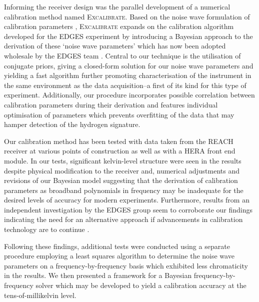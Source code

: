 Informing the receiver design was the parallel development of a numerical calibration method named \textsc{Excalibrate}. Based on the noise wave formulation of calibration parameters \citep{meys}, \textsc{Excalibrate} expands on the calibration algorithm developed for the EDGES experiment \citep{edgesCal} by introducing a Bayesian approach to the derivation of these ‘noise wave parameters’ which has now been adopted wholesale by the EDGES team \citep{murray_calpap}. Central to our technique is the utilisation of conjugate priors, giving a closed-form solution for our noise wave parameters and yielding a fast algorithm further promoting characterisation of the instrument in the same environment as the data acquisition--a first of its kind for this type of experiment. Additionally, our procedure incorporates possible correlation between calibration parameters during their derivation and features individual optimisation of parameters which prevents overfitting of the data that may hamper detection of the hydrogen signature.

Our calibration method has been tested with data taken from the REACH receiver at various points of construction as well as with a HERA front end module. In our tests, significant kelvin-level structure were seen in the results despite physical modification to the receiver and, numerical adjustments and revisions of our Bayesian model suggesting that the derivation of calibration parameters as broadband polynomials in frequency may be inadequate for the desired levels of accuracy for modern experiments. Furthermore, results from an independent investigation by the EDGES group seem to corroborate our findings indicating the need for an alternative approach if advancements in calibration technology are to continue \citep{murray_calpap}.

Following these findings, additional tests were conducted using a separate procedure employing a least squares algorithm to determine the noise wave parameters on a frequency-by-frequency basis which exhibited less chromaticity in the results. We then presented a framework for a Bayesian frequency-by-frequency solver which may be developed to yield a calibration accuracy at the tens-of-millikelvin level.


